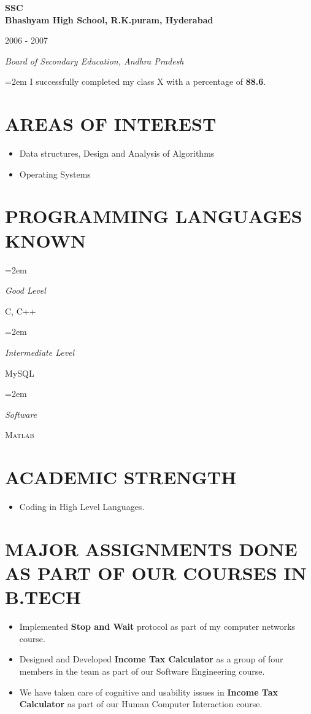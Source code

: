 \documentclass[paper=a4,fontsize=11pt]{scrartcl} %
\newlength{\spacebox}
\newcommand{\sepspace}{\vspace*{1em}}		%
\newcommand{\NewPart}[1]{\section*{\uppercase{#1}}}
\newcommand{\PersonalEntry}[2]{
		\noindent\hangindent=2em\hangafter=0 %
		\parbox{\spacebox}{        %
		\textit{#1}}		       %
		\hspace{1.5em} #2 \par}    %
\newcommand{\SkillsEntry}[2]{      %
		\noindent\hangindent=2em\hangafter=0 %
		\parbox{\spacebox}{        %
		\textit{#1}}			   %
		\hspace{1.5em} #2 \par}    %
\newcommand{\EducationEntry}[4]{
		\noindent \textbf{#1} \hfill      %
		\colorbox{ashgrey}{%
			\parbox{6em}{%
			\hfill\color{Black}#2}} \par  %
		\noindent \textit{#3} \par        %
		\noindent\hangindent=2em\hangafter=0 \small #4 %
		\normalsize \par}
\begin{document}
\EducationEntry{SSC\\Bhashyam High School, R.K.puram, Hyderabad}{2006 - 2007}{Board of Secondary Education, Andhra Pradesh}{I successfully completed my class X with a percentage of \textbf{88.6}.}

\NewPart{Areas of Interest}{}
\begin{itemize}
\item Data structures, Design and Analysis of Algorithms
\item Operating Systems
\end{itemize}


\NewPart{Programming Languages known}{}


\SkillsEntry{Good Level}{C, C++}
\vspace*{3mm}
\SkillsEntry{Intermediate Level}{MySQL}
\vspace*{3mm}
\SkillsEntry{Software}{\textsc{Matlab}}


\newpage
\NewPart{Academic Strength}{}
\begin{itemize}
\item Coding in High Level Languages.
\end{itemize}


\NewPart{Major Assignments done as part of our courses in B.Tech}{}
\begin{itemize}
\item Implemented \textbf{Stop and Wait} protocol as part of my computer networks course.
\item Designed and Developed \textbf{Income Tax Calculator} as a group of four members in the team as part of our Software Engineering course.
\item We have taken care of cognitive and usability issues in \textbf{Income Tax Calculator} as part of our Human Computer Interaction course.
\end{itemize}
\end{document}

